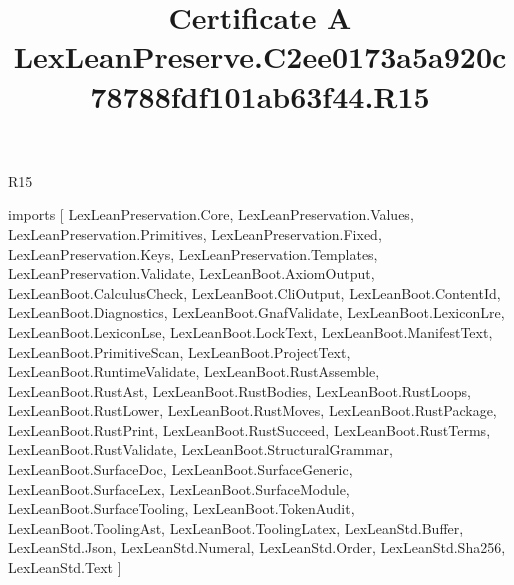 \begin{lexlean}{R15}
\title{Certificate A LexLeanPreserve.C2ee0173a5a920c78788fdf101ab63f44.R15}
\begin{coremodule}
imports [
  LexLeanPreservation.Core,
  LexLeanPreservation.Values,
  LexLeanPreservation.Primitives,
  LexLeanPreservation.Fixed,
  LexLeanPreservation.Keys,
  LexLeanPreservation.Templates,
  LexLeanPreservation.Validate,
  LexLeanBoot.AxiomOutput,
  LexLeanBoot.CalculusCheck,
  LexLeanBoot.CliOutput,
  LexLeanBoot.ContentId,
  LexLeanBoot.Diagnostics,
  LexLeanBoot.GnafValidate,
  LexLeanBoot.LexiconLre,
  LexLeanBoot.LexiconLse,
  LexLeanBoot.LockText,
  LexLeanBoot.ManifestText,
  LexLeanBoot.PrimitiveScan,
  LexLeanBoot.ProjectText,
  LexLeanBoot.RuntimeValidate,
  LexLeanBoot.RustAssemble,
  LexLeanBoot.RustAst,
  LexLeanBoot.RustBodies,
  LexLeanBoot.RustLoops,
  LexLeanBoot.RustLower,
  LexLeanBoot.RustMoves,
  LexLeanBoot.RustPackage,
  LexLeanBoot.RustPrint,
  LexLeanBoot.RustSucceed,
  LexLeanBoot.RustTerms,
  LexLeanBoot.RustValidate,
  LexLeanBoot.StructuralGrammar,
  LexLeanBoot.SurfaceDoc,
  LexLeanBoot.SurfaceGeneric,
  LexLeanBoot.SurfaceLex,
  LexLeanBoot.SurfaceModule,
  LexLeanBoot.SurfaceTooling,
  LexLeanBoot.TokenAudit,
  LexLeanBoot.ToolingAst,
  LexLeanBoot.ToolingLatex,
  LexLeanStd.Buffer,
  LexLeanStd.Json,
  LexLeanStd.Numeral,
  LexLeanStd.Order,
  LexLeanStd.Sha256,
  LexLeanStd.Text
]


\end{coremodule}
\end{lexlean}
